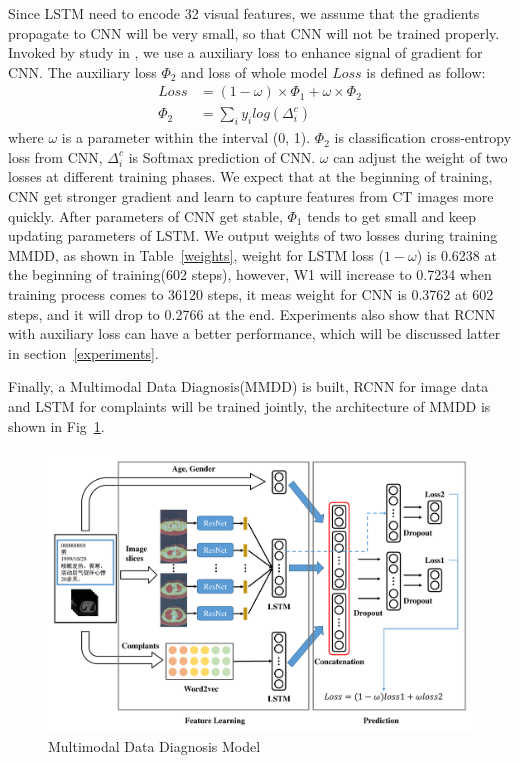 \documentclass[journal]{IEEEtran}
\begin{document}
Since LSTM need to encode 32 visual features, we assume that the gradients propagate to CNN will be very small, so that CNN will not be trained properly. Invoked by study in \cite{szegedy2016rethinking}, we use a auxiliary loss to enhance signal of gradient for CNN.
The auxiliary loss $\Phi_2$ and loss of whole model $Loss$ is defined as follow: 
\begin{align*}
Loss &=  (1 - \omega) \times \Phi_1 +  \omega \times \Phi_2 \\
\Phi_2 &= \sum_i{y_i log(\Delta^c_i)}
\end{align*}
where $\omega$ is a parameter within the interval (0, 1). $\Phi_2$ is classification cross-entropy loss from CNN, $\Delta^c_i$ is Softmax prediction of CNN. $\omega$ can adjust the weight of two losses at different training phases.
We expect that at the beginning of training, CNN get stronger gradient and learn to capture features from CT images more quickly. After parameters of CNN get stable, $\Phi_1$ tends to get small and keep updating parameters of LSTM. We output weights of two losses during training MMDD, as shown in Table~\ref{weights}, weight for LSTM loss ($1 - \omega$) is 0.6238 at the beginning of training(602 steps), however, W1 will increase to 0.7234 when training process comes to 36120 steps, it meas weight for CNN is 0.3762 at 602 steps, and it will drop to 0.2766 at the end. Experiments also show that RCNN with auxiliary loss can have a better performance, which will be discussed latter in section~\ref{experiments}.

Finally, a Multimodal Data Diagnosis(MMDD) is built, RCNN for image data and LSTM for complaints will be trained jointly, the architecture of MMDD is shown in Fig~\ref{MMDD}. 

\begin{figure}[t]
    \centerline{\includegraphics[width=160mm]{MMDD.pdf}}
    \vspace{-0cm}
    \caption{Multimodal Data Diagnosis Model}
    \vspace{-0cm}
    \label{MMDD}
    \end{figure}
\end{document}
